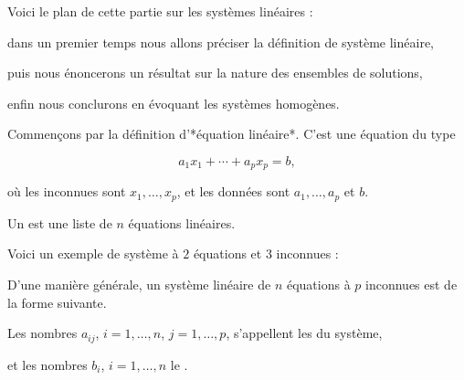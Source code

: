 







\debuttexte


\diapo

\change

Voici le plan de cette partie sur les systèmes linéaires :

\change

dans un premier temps nous allons préciser la définition de système linéaire,

\change

puis nous énoncerons un résultat sur la nature des ensembles de solutions,

enfin nous conclurons en évoquant les systèmes homogènes.


\diapo

Commençons par la définition d'*équation linéaire*. C'est une équation du type

\begin{equation*}
  a_1 x_1 + \cdots + a_p x_p = b,
\end{equation*}

où les inconnues sont $x_1,\ldots,x_p$, et les données sont $a_1, \ldots, a_p $ et $b$.

\change

Un  est une liste de $n$ équations linéaires.

\change

Voici un exemple de système à $2$ équations et $3$ inconnues : 


\diapo

D'une manière générale, un système linéaire de $n$ équations à $p$ inconnues est de la forme suivante.


\change

Les nombres $a_{ij}$, $i=1,\ldots, n$, $j=1,\ldots, p$, s'appellent les  du système, 

\change

et les nombres $b_{i}$, $i=1,\ldots, n$ le .



